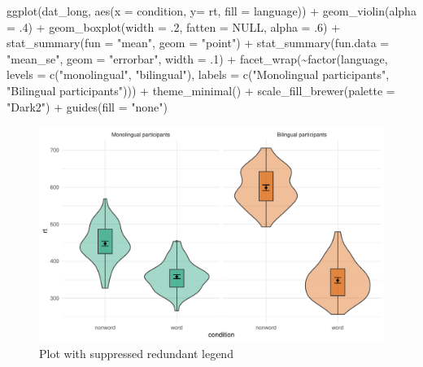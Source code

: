 \documentclass[
  english,
  doc,floatsintext]{apa6}
\newenvironment{Shaded}{\begin{snugshade}}{\end{snugshade}}
\newcommand{\AttributeTok}[1]{\textcolor[rgb]{0.77,0.63,0.00}{#1}}
\newcommand{\ConstantTok}[1]{\textcolor[rgb]{0.00,0.00,0.00}{#1}}
\newcommand{\DecValTok}[1]{\textcolor[rgb]{0.00,0.00,0.81}{#1}}
\newcommand{\FunctionTok}[1]{\textcolor[rgb]{0.00,0.00,0.00}{#1}}
\newcommand{\NormalTok}[1]{#1}
\newcommand{\SpecialCharTok}[1]{\textcolor[rgb]{0.00,0.00,0.00}{#1}}
\newcommand{\StringTok}[1]{\textcolor[rgb]{0.31,0.60,0.02}{#1}}
\begin{document}
\begin{Shaded}
\begin{Highlighting}[]
\FunctionTok{ggplot}\NormalTok{(dat\_long, }\FunctionTok{aes}\NormalTok{(}\AttributeTok{x =}\NormalTok{ condition, }\AttributeTok{y=}\NormalTok{ rt, }\AttributeTok{fill =}\NormalTok{ language)) }\SpecialCharTok{+}
  \FunctionTok{geom\_violin}\NormalTok{(}\AttributeTok{alpha =}\NormalTok{ .}\DecValTok{4}\NormalTok{) }\SpecialCharTok{+}
  \FunctionTok{geom\_boxplot}\NormalTok{(}\AttributeTok{width =}\NormalTok{ .}\DecValTok{2}\NormalTok{, }\AttributeTok{fatten =} \ConstantTok{NULL}\NormalTok{, }\AttributeTok{alpha =}\NormalTok{ .}\DecValTok{6}\NormalTok{) }\SpecialCharTok{+}
  \FunctionTok{stat\_summary}\NormalTok{(}\AttributeTok{fun =} \StringTok{"mean"}\NormalTok{, }\AttributeTok{geom =} \StringTok{"point"}\NormalTok{) }\SpecialCharTok{+}
  \FunctionTok{stat\_summary}\NormalTok{(}\AttributeTok{fun.data =} \StringTok{"mean\_se"}\NormalTok{, }\AttributeTok{geom =} \StringTok{"errorbar"}\NormalTok{, }\AttributeTok{width =}\NormalTok{ .}\DecValTok{1}\NormalTok{) }\SpecialCharTok{+}
  \FunctionTok{facet\_wrap}\NormalTok{(}\SpecialCharTok{\textasciitilde{}}\FunctionTok{factor}\NormalTok{(language, }
                     \AttributeTok{levels =} \FunctionTok{c}\NormalTok{(}\StringTok{"monolingual"}\NormalTok{, }\StringTok{"bilingual"}\NormalTok{),}
                     \AttributeTok{labels =} \FunctionTok{c}\NormalTok{(}\StringTok{"Monolingual participants"}\NormalTok{, }
                                \StringTok{"Bilingual participants"}\NormalTok{))) }\SpecialCharTok{+}
  \FunctionTok{theme\_minimal}\NormalTok{() }\SpecialCharTok{+}
  \FunctionTok{scale\_fill\_brewer}\NormalTok{(}\AttributeTok{palette =} \StringTok{"Dark2"}\NormalTok{) }\SpecialCharTok{+}
  \FunctionTok{guides}\NormalTok{(}\AttributeTok{fill =} \StringTok{"none"}\NormalTok{)}
\end{Highlighting}
\end{Shaded}

\begin{figure}

{\centering \includegraphics[width=1\linewidth]{images/legend-suppress-1} 

}

\caption{Plot with suppressed redundant legend}\label{fig:legend-suppress}
\end{figure}
\end{document}
